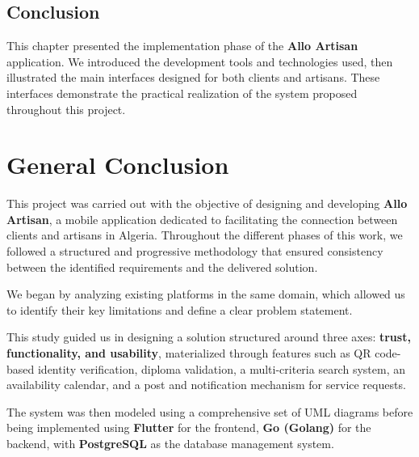 \documentclass[12pt,a4paper]{report}
\begin{document}
\section{Conclusion}

This chapter presented the implementation phase of the \textbf{Allo Artisan} application. We introduced the development tools and technologies used, then illustrated the main interfaces designed for both clients and artisans. These interfaces demonstrate the practical realization of the system proposed throughout this project.


\clearpage
\chapter*{General Conclusion}
\thispagestyle{empty}

This project was carried out with the objective of designing and developing \textbf{Allo Artisan}, a mobile application dedicated to facilitating the connection between clients and artisans in Algeria. Throughout the different phases of this work, we followed a structured and progressive methodology that ensured consistency between the identified requirements and the delivered solution.

\vspace{0.3cm}

We began by analyzing existing platforms in the same domain, which allowed us to identify their key limitations and define a clear problem statement.

\vspace{0.3cm}

This study guided us in designing a solution structured around three axes: \textbf{trust, functionality, and usability}, materialized through features such as QR code-based identity verification, diploma validation, a multi-criteria search system, an availability calendar, and a post and notification mechanism for service requests.

\vspace{0.3cm}

The system was then modeled using a comprehensive set of UML diagrams before being implemented using \textbf{Flutter} for the frontend, \textbf{Go (Golang)} for the backend, with \textbf{PostgreSQL} as the database management system.
\end{document}
